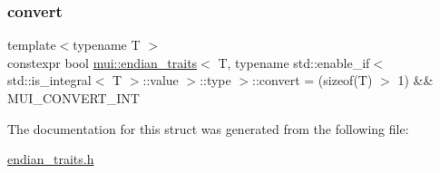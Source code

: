 \subsubsection{\texorpdfstring{convert}{convert}}
{\footnotesize\ttfamily template$<$typename T $>$ \\
constexpr bool \hyperlink{structmui_1_1endian__traits}{mui\+::endian\+\_\+traits}$<$ T, typename std\+::enable\+\_\+if$<$ std\+::is\+\_\+integral$<$ T $>$\+::value $>$\+::type $>$\+::convert = (sizeof(T) $>$ 1) \&\& M\+U\+I\+\_\+\+C\+O\+N\+V\+E\+R\+T\+\_\+\+I\+NT\hspace{0.3cm}{\ttfamily [static]}}



The documentation for this struct was generated from the following file\+:\begin{DoxyCompactItemize}
\item 
\hyperlink{endian__traits_8h}{endian\+\_\+traits.\+h}\end{DoxyCompactItemize}
